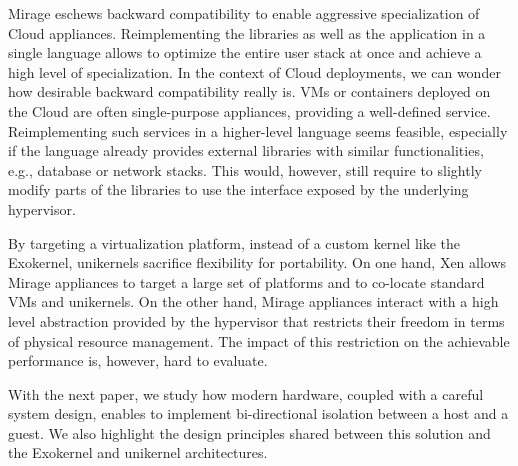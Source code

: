 Mirage eschews backward compatibility to enable aggressive specialization of Cloud appliances.
Reimplementing the libraries as well as the application in a single language allows to optimize the entire user stack at once and achieve a high level of specialization.
In the context of Cloud deployments, we can wonder how desirable backward compatibility really is.
VMs or containers deployed on the Cloud are often single-purpose appliances, providing a well-defined service.
Reimplementing such services in a higher-level language seems feasible, especially if the language already provides external libraries with similar functionalities, e.g., database or network stacks.
This would, however, still require to slightly modify parts of the libraries to use the interface exposed by the underlying hypervisor.

By targeting a virtualization platform, instead of a custom kernel like the Exokernel, unikernels sacrifice flexibility for portability.
On one hand, Xen allows Mirage appliances to target a large set of platforms and to co-locate standard VMs and unikernels.
On the other hand, Mirage appliances interact with a high level abstraction provided by the hypervisor that restricts their freedom in terms of physical resource management.
The impact of this restriction on the achievable performance is, however, hard to evaluate.

With the next paper, we study how modern hardware, coupled with a careful system design, enables to implement bi-directional isolation between a host and a guest.
We also highlight the design principles shared between this solution and the Exokernel and unikernel architectures.


